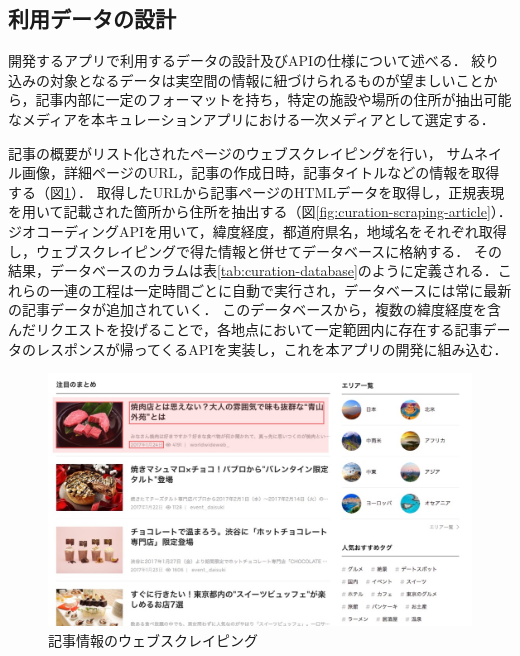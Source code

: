 \documentclass[a4paper]{jsarticle}
\begin{document}
\begin{enumerate}
\begin{enumerate}
\subsection{利用データの設計}
開発するアプリで利用するデータの設計及びAPIの仕様について述べる．
絞り込みの対象となるデータは実空間の情報に紐づけられるものが望ましいことから，記事内部に一定のフォーマットを持ち，特定の施設や場所の住所が抽出可能なメディアを本キュレーションアプリにおける一次メディアとして選定する．


記事の概要がリスト化されたページのウェブスクレイピングを行い，
サムネイル画像，詳細ページのURL，記事の作成日時，記事タイトルなどの情報を取得する（図\ref{fig:curation-scraping-list}）．
取得したURLから記事ページのHTMLデータを取得し，正規表現を用いて記載された箇所から住所を抽出する（図\ref{fig:curation-scraping-article}）．
ジオコーディングAPIを用いて，緯度経度，都道府県名，地域名をそれぞれ取得し，ウェブスクレイピングで得た情報と併せてデータベースに格納する．
その結果，データベースのカラムは表\ref{tab:curation-database}のように定義される．これらの一連の工程は一定時間ごとに自動で実行され，データベースには常に最新の記事データが追加されていく．
このデータベースから，複数の緯度経度を含んだリクエストを投げることで，各地点において一定範囲内に存在する記事データのレスポンスが帰ってくるAPIを実装し，これを本アプリの開発に組み込む．

\fifigure
\begin{figure}[H]
  \begin{center}
    \includegraphics[width=0.95\hsize]{./images/curation_scraping_list.jpg}
    \caption{記事情報のウェブスクレイピング}
    \label{fig:curation-scraping-list}
  \end{center}
\end{figure}
\fi


\end{enumerate}
\end{enumerate}
\end{document}
